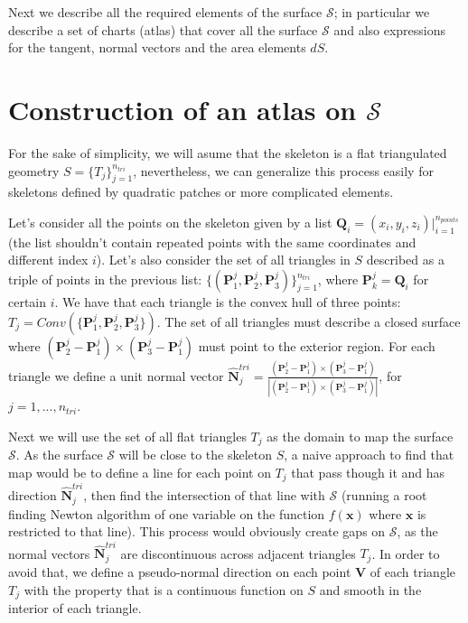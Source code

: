 \documentclass[11pt, oneside]{article}
\newcommand\bx{\boldsymbol x}
\newcommand\bP{\boldsymbol P}
\newcommand\bN{\boldsymbol N}
\newcommand\bQ{\boldsymbol Q}
\newcommand\bV{\boldsymbol V}
\begin{document}
Next we describe all the required elements of the surface $\mathcal{S}$; in particular we describe a set of charts (atlas) that cover all the surface $\mathcal{S}$ and also expressions for the tangent, normal vectors and the area elements $dS$.








\section{Construction of an atlas on $\mathcal{S}$}

For the sake of simplicity, we will asume that the skeleton is a flat triangulated geometry $\mathit{S}=\{\mathit{T}_j\}_{j=1}^{n_{tri}}$, nevertheless, we can generalize this process easily for skeletons defined by quadratic patches or more complicated elements.

Let's consider all the points on the skeleton given by a list $\bQ_i=(x_i,y_i,z_i)\big|_{i=1}^{n_{points}}$ (the list shouldn't contain repeated points with the same coordinates and different index $i$). Let's also consider the set of all triangles in $\mathit{S}$ described as a triple of points in the previous list: $\{(\bP_1^j,\bP_2^j,\bP_3^j)\}_{j=1}^{n_{tri}}$, where $\bP_k^j=\bQ_i$ for certain $i$. We have that each triangle is the convex hull of three points: $\mathit{T}_j=Conv(\{\bP_1^j,\bP_2^j,\bP_3^j\})$. The set of all triangles must describe a closed surface where $(\bP^j_2-\bP^j_1)\times (\bP^j_3-\bP^j_1)$ must point to the exterior region. For each triangle we define a unit normal vector $\hat{\bN}^{tri}_j=\frac{(\bP^j_2-\bP^j_1)\times (\bP^j_3-\bP^j_1)}{|(\bP^j_2-\bP^j_1)\times (\bP^j_3-\bP^j_1)|}$, for $j=1,...,n_{tri}$.

Next we will use the set of all flat triangles $\mathit{T}_j$ as the domain to map the surface $\mathcal{S}$. As the surface $\mathcal{S}$ will be close to the skeleton $\mathit{S}$, a naive approach to find that map would be to define a line for each point on $\mathit{T}_j$ that pass though it and has direction $\hat{\bN}^{tri}_j$, then find the intersection of that line with $\mathcal{S}$ (running a root finding Newton algorithm of one variable on the function $f(\bx)$ where $\bx$ is restricted to that line). This process would obviously create gaps on $\mathcal{S}$, as the normal vectors $\hat{\bN}^{tri}_j$ are discontinuous across adjacent triangles $\mathit{T}_j$. In order to avoid that, we define a pseudo-normal direction on each point $\bV$ of each triangle $\mathit{T}_j$ with the property that is a continuous function on $\mathit{S}$ and smooth in the interior of each triangle.
\end{document}
